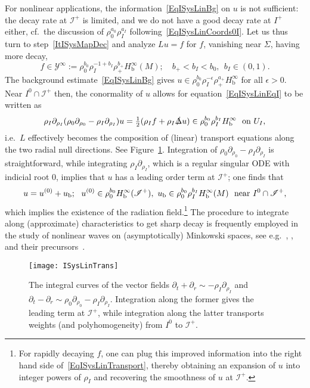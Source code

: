 \documentclass[reqno,11pt,letterpaper]{amsart}
\numberwithin{equation}{section}
\numberwithin{figure}{section}
\theoremstyle{definition}
\theoremstyle{remark}
\newcommand{\mc}{\mathcal}
\newcommand{\cY}{\mc Y}
\newcommand{\ms}{\mathscr}
\newcommand{\scri}{\ms I}
\newcommand{\slDelta}{\slashed{\Delta}{}}
\newcommand{\eps}{\epsilon}
\newcommand{\pa}{\partial}
\newcommand{\tn}{\textnormal}
\newcommand{\bop}{{\mathrm{b}}}
\newcommand{\half}{\tfrac{1}{2}}
\newcommand{\Hb}{H_{\bop}}
\begin{document}
For nonlinear applications, the information~\eqref{EqISysLinBg} on $u$ is not sufficient: the decay rate at $\scri^+$ is limited, and we do not have a good decay rate at $I^+$ either, cf.\ the discussion of $\rho_0^{a_0}\rho_I^{a_I}$ following~\eqref{EqISysLinCoords0I}. Let us thus turn to step~\ref{ItISysMapDec} and analyze $L u=f$ for $f$, vanishing near $\Sigma$, having more decay,
\begin{equation}
\label{EqISysLinY}
  f\in \cY^\infty := \rho_0^{b_0}\rho_I^{-1+b_I}\rho_+^{b_+}\Hb^\infty(M);\quad
  b_+<b_I<b_0,\ \ b_I\in(0,1).
\end{equation}
The background estimate~\eqref{EqISysLinBg} gives $u\in\rho_0^{b_0}\rho_I^{-\eps}\rho_+^{a_+}\Hb^\infty$ for all $\eps>0$. Near $I^0\cap\scri^+$ then, the conormality of $u$ allows for equation~\eqref{EqISysLinEqI} to be written as
\begin{equation}
\label{EqISysLinTransport}
  \rho_I\pa_{\rho_I}(\rho_0\pa_{\rho_0}-\rho_I\pa_{\rho_I})u = \half(\rho_I f + \rho_I\slDelta u) \in \rho_0^{b_0}\rho_I^{b_I}\Hb^\infty\ \ \tn{on}\ U_I,
\end{equation}
i.e.\ $L$ effectively becomes the composition of (linear) transport equations along the two radial null directions. See Figure~\ref{FigISysLinTrans}. Integration of $\rho_0\pa_{\rho_0}-\rho_I\pa_{\rho_I}$ is straightforward, while integrating $\rho_I\pa_{\rho_I}$, which is a regular singular ODE with indicial root $0$, implies that $u$ has a leading order term at $\scri^+$; one finds that
\[
  u = u^{(0)} + u_\bop;\ \ u^{(0)}\in\rho_0^{b_0}\Hb^\infty(\scri^+),\ u_\bop\in\rho_0^{b_0}\rho_I^{b_I}\Hb^\infty(M)\ \ \tn{near}\ I^0\cap\scri^+,
\]
which implies the existence of the radiation field.\footnote{For rapidly decaying $f$, one can plug this improved information into the right hand side of~\eqref{EqISysLinTransport}, thereby obtaining an expansion of $u$ into integer powers of $\rho_I$ and recovering the smoothness of $u$ at $\scri^+$.} The procedure to integrate along (approximate) characteristics to get sharp decay is frequently employed in the study of nonlinear waves on (asymptotically) Minkowski spaces, see e.g.\ \cite[\S2.2]{LindbladRodnianskiGlobalStability}, \cite{LindbladAsymptotics}, and their precursors~\cite{LindbladLifespan,LindbladGlobalNonlinear}.

\begin{figure}[!ht]
\texttt{[image: ISysLinTrans]}
\caption{The integral curves of the vector fields $\pa_t+\pa_r\sim-\rho_I\pa_{\rho_I}$ and $\pa_t-\pa_r\sim\rho_0\pa_{\rho_0}-\rho_I\pa_{\rho_I}$. Integration along the former gives the leading term at $\scri^+$, while integration along the latter transports weights (and polyhomogeneity) from $I^0$ to $\scri^+$.}
\label{FigISysLinTrans}
\end{figure}
\end{document}
